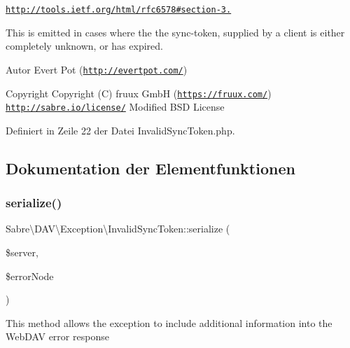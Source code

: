 \href{http://tools.ietf.org/html/rfc6578#section-3.2}{\tt http\+://tools.\+ietf.\+org/html/rfc6578\#section-\/3.}

This is emitted in cases where the the sync-\/token, supplied by a client is either completely unknown, or has expired.

\begin{DoxyAuthor}{Autor}
Evert Pot (\href{http://evertpot.com/}{\tt http\+://evertpot.\+com/}) 
\end{DoxyAuthor}
\begin{DoxyCopyright}{Copyright}
Copyright (C) fruux GmbH (\href{https://fruux.com/}{\tt https\+://fruux.\+com/})  \href{http://sabre.io/license/}{\tt http\+://sabre.\+io/license/} Modified B\+SD License 
\end{DoxyCopyright}


Definiert in Zeile 22 der Datei Invalid\+Sync\+Token.\+php.



\subsection{Dokumentation der Elementfunktionen}
\mbox{\label{class_sabre_1_1_d_a_v_1_1_exception_1_1_invalid_sync_token_ab014ed2b556cd17adef21e8eaf38a3c8}} 
\subsubsection{\texorpdfstring{serialize()}{serialize()}}
{\footnotesize\ttfamily Sabre\textbackslash{}\+D\+A\+V\textbackslash{}\+Exception\textbackslash{}\+Invalid\+Sync\+Token\+::serialize (\begin{DoxyParamCaption}\item[{\mbox{\hyperlink{class_sabre_1_1_d_a_v_1_1_server}{D\+A\+V\textbackslash{}\+Server}}}]{\$server,  }\item[{\textbackslash{}D\+O\+M\+Element}]{\$error\+Node }\end{DoxyParamCaption})}

This method allows the exception to include additional information into the Web\+D\+AV error response


